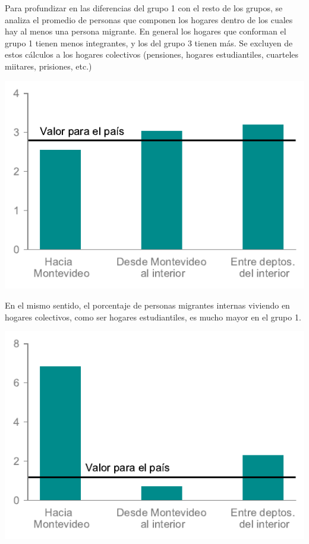 \documentclass[12pt,spanish,]{article}
\let\origfigure\figure
\let\endorigfigure\endfigure
\renewenvironment{figure}[1][2] {
    \expandafter\origfigure\expandafter[H]
} {
    \endorigfigure
}
\begin{document}
Para profundizar en las diferencias del grupo 1 con el resto de los
grupos, se analiza el promedio de personas que componen los hogares
dentro de los cuales hay al menos una persona migrante. En general los
hogares que conforman el grupo 1 tienen menos integrantes, y los del
grupo 3 tienen más. Se excluyen de estos cálculos a los hogares
colectivos (pensiones, hogares estudiantiles, cuarteles miitares,
prisiones, etc.)

\begin{figure}
\hypertarget{fig:prom_perso_hogar}{%
\centering
\includegraphics{./tex2pdf.-8c1f0593c1a83dbe/c6ede563c6d7a200b20028927b4edd7e49ad66bd.pdf}
\caption{Promedio de personas por hogar, excluyendo hogares
colectivos}\label{fig:prom_perso_hogar}
}
\end{figure}

En el mismo sentido, el porcentaje de personas migrantes internas
viviendo en hogares colectivos, como ser hogares estudiantiles, es mucho
mayor en el grupo 1.

\begin{figure}
\hypertarget{fig:viv_colectivas}{%
\centering
\includegraphics{./tex2pdf.-8c1f0593c1a83dbe/8480b873ee7013ad523b67bbe5cc238a5ff00ee5.pdf}
\caption{Porcentaje de personas viviendo en hogares
colectivos}\label{fig:viv_colectivas}
}
\end{figure}
\end{document}
